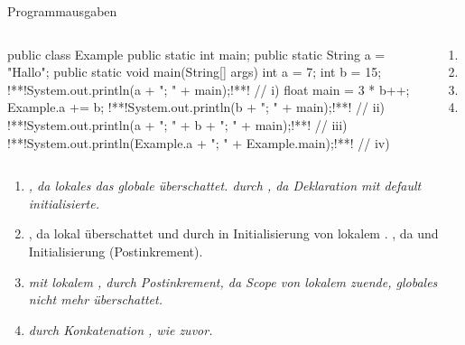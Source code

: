 \begin{frame}[c,fragile]{Programmausgaben}
\vspace*{-\baselineskip}\begin{columns}[onlytextwidth,c]
\begin{plainjava}
public class Example {
   public static int main;
   public static String a = "Hallo";
   public static void main(String[] args) {
      int a = 7;
      int b = 15;
      !**!System.out.println(a + "; " + main);!**! // i)
      {
         float main = 3 * b++;
         Example.a += b;
         !**!System.out.println(b + "; " + main);!**! // ii)
      }
      !**!System.out.println(a + "; " + b + "; " + main);!**! // iii)
      !**!System.out.println(Example.a + "; " + Example.main);!**! // iv)
   }
}
\end{plainjava}
\small{}%
\begin{enumerate}
   \itemsep4.5pt
   \item<3->[i)] 
   \item<5->[ii)] 
   \item<7->[iii)] 
   \item<9->[iv)] 
\end{enumerate}
\end{columns}
\vspace*{4mm}
{\scriptsize\begin{enumerate}
   \itemsep7pt
   \item<4->[i)] \textit{, da lokales  das globale  überschattet.  durch , da Deklaration mit default  initialisierte.}
   \item<6->[ii)] \textit{}, da lokal überschattet und durch  in Initialisierung von lokalem . , da  und Initialisierung  (Postinkrement).
   \item<8->[iii)] \textit{ mit lokalem ,  durch Postinkrement,  da Scope von lokalem  zuende, globales  nicht mehr überschattet.}
   \item<10->[iv)] \textit{ durch Konkatenation ,  wie zuvor.}

\end{enumerate}}
\end{frame}
